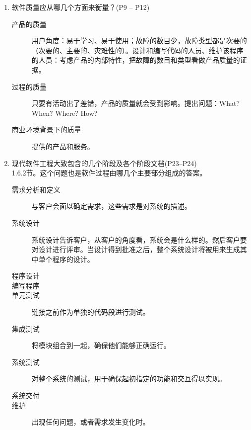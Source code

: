 \documentclass[14pt, letterpaper, UTF8, fontset=windowsnew, heading=true]{article}
\begin{document}
\begin{enumerate}
	\item 软件质量应从哪几个方面来衡量？(P9 -- P12)
	\begin{description}
		\item[产品的质量] 用户角度：易于学习、易于使用；故障的数目少，故障类型都是次要的（次要的、主要的、灾难性的）。设计和编写代码的人员、维护该程序的人员：考虑产品的内部特性，把故障的数目和类型看做产品质量的证据。
		\item[过程的质量] 只要有活动出了差错，产品的质量就会受到影响。提出问题：What? When? Where? How?
		\item[商业环境背景下的质量] 提供的产品和服务。
	\end{description}


	\item 现代软件工程大致包含的几个阶段及各个阶段文档(P23--P24) \\
	1.6.2节。这个问题也是软件过程由哪几个主要部分组成的答案。
	\begin{description}
		\item[需求分析和定义] 与客户会面以确定需求，这些需求是对系统的描述。
		\item[系统设计] 系统设计告诉客户，从客户的角度看，系统会是什么样的。然后客户要对设计进行评审。当设计得到批准之后，整个系统设计将被用来生成其中单个程序的设计。
		\item[程序设计] 
		\item[编写程序]
		\item[单元测试] 链接之前作为单独的代码段进行测试。
		\item[集成测试] 将模块组合到一起，确保他们能够正确运行。
		\item[系统测试] 对整个系统的测试，用于确保起初指定的功能和交互得以实现。
		\item[系统交付] 
		\item[维护] 出现任何问题，或者需求发生变化时。
	\end{description}


\end{enumerate}
\end{document}
